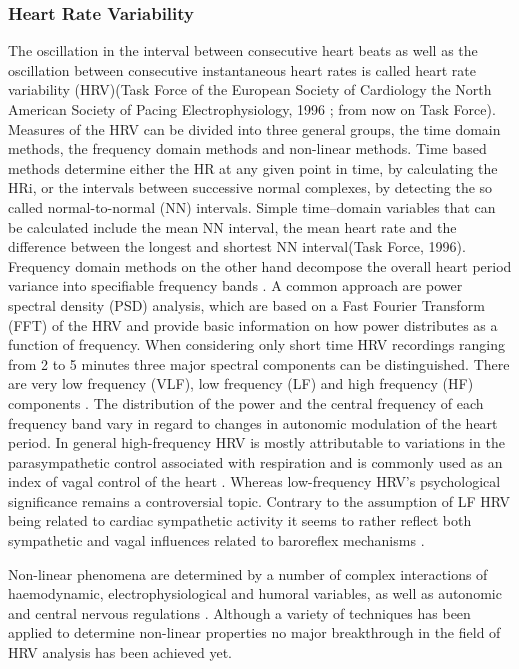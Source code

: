 \subsubsection{Heart Rate Variability}
The oscillation in the interval between consecutive heart beats as well as the oscillation between consecutive instantaneous heart rates is called heart rate variability (HRV)(Task Force of the European Society of Cardiology the North American Society of Pacing Electrophysiology, 1996 ; from now on Task Force).
Measures of the HRV can be divided into three general groups, the time domain methods, the frequency domain methods and non-linear methods. Time based methods determine either the HR at any given point in time, by calculating the HRi, or the intervals between successive normal complexes, by detecting the so called normal-to-normal (NN) intervals.
Simple time–domain variables that can be calculated include the mean NN interval, the mean heart rate and the difference between the longest and shortest NN interval(Task Force, 1996). Frequency domain methods on the other hand decompose the overall heart period variance into specifiable frequency bands \citep{HANDBOOKPP}. A common approach are power spectral density (PSD) analysis, which are based on a Fast Fourier Transform (FFT) of the HRV and provide basic information on how power distributes as a function of frequency. When considering only short time HRV recordings ranging from 2 to 5 minutes three major spectral components can be distinguished. There are very low frequency (VLF), low frequency (LF) and high frequency (HF) components \cite{TASK1996}. The distribution of the power and the central frequency of each frequency band vary in regard to changes in autonomic modulation of the heart period. In general high-frequency HRV is mostly attributable to variations in the parasympathetic control associated with respiration and is commonly used as an index of vagal control of the heart \citep{HANDBOOKPP}. Whereas low-frequency HRV's psychological significance remains a controversial topic. Contrary to the assumption of LF HRV being related to cardiac sympathetic activity it seems to rather  reflect both sympathetic and vagal influences related to baroreflex mechanisms \cite{BERNTSON1997}.

Non-linear phenomena are determined by a number of complex interactions of haemodynamic, electrophysiological and humoral variables, as well as autonomic and central nervous regulations \cite{TASK1996}. Although a  variety of techniques has been applied to determine non-linear properties no major breakthrough in the field of HRV analysis has been achieved yet. 

